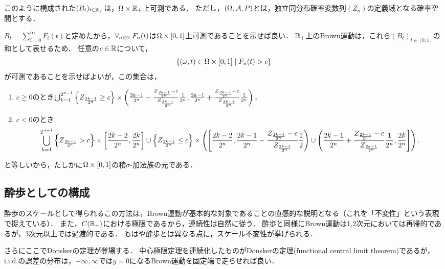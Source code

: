 \documentclass[uplatex,dvipdfmx]{jsreport}
\begin{document}
\begin{proposition}
    このように構成された$(B_t)_{t\in\mathbb{R}_+}$は，$\Omega\times\mathbb{R}_+$上可測である．
    ただし，$(\Omega,\mathcal{A},P)$とは，独立同分布確率変数列$(Z_n)$の定義域となる確率空間とする．
\end{proposition}
\begin{Proof}
    $B_t=\sum^\infty_{i=0}F_i(t)$と定めたから，$\forall_{n\in\mathbb{N}}\;F_n(t)$は$\Omega\times[0,1]$上可測であることを示せば良い．
    $\mathbb{R}_+$上のBrown運動は，これら$(B_t)_{t\in[0,1]}$の和として表せるため．
    任意の$c\in\mathbb{R}$について，
    \[\left\{(\omega,t)\in\Omega\times[0,1]\mid F_n(t)>c\right\}\]
    が可測であることを示せばよいが，この集合は，
    \begin{enumerate}
        \item $c\ge0$のとき$\bigcup_{k=1}^{2^{n-1}}\left\{Z_{\frac{2k-1}{2^n}}\ge c\right\}\times\left(\frac{2k-1}{2^n}-\frac{Z_{\frac{2k-1}{2^n}}-c}{Z_{\frac{2k-1}{2^n}}}\frac{1}{2^n},\frac{2k-1}{2^n}+\frac{Z_{\frac{2k-1}{2^n}}-c}{Z_{\frac{2k-1}{2^n}}}\frac{1}{2^n}\right)$．
        \item $c<0$のとき\[\bigcup_{k=1}^{2^{n-1}}\left\{Z_{\frac{2k-1}{2^n}}>c\right\}\times\left[\frac{2k-2}{2^n},\frac{2k}{2^n}\right]\cup\left\{Z_{\frac{2k-1}{2^n}}\le c\right\}\times\left(\left[\frac{2k-2}{2^n},\frac{2k-1}{2^n}-\frac{Z_{\frac{2k-1}{2^n}}-c}{Z_{\frac{2k-1}{2^n}}}\frac{1}{2}\right)\cup\left(\frac{2k-1}{2^n}+\frac{Z_{\frac{2k-1}{2^n}}-c}{Z_{\frac{2k-1}{2^n}}}\frac{1}{2^n},\frac{2k}{2^n}\right]\right).\]
    \end{enumerate}
    と等しいから，たしかに$\Omega\times[0,1]$の積$\sigma$-加法族の元である．
\end{Proof}

\subsection{酔歩としての構成}

\begin{tcolorbox}[colframe=ForestGreen, colback=ForestGreen!10!white,breakable,colbacktitle=ForestGreen!40!white,coltitle=black,fonttitle=\bfseries\sffamily,
title=]
    酔歩のスケールとして得られるこの方法は，Brown運動が基本的な対象であることの直感的な説明となる（これを「不変性」という表現で捉えている）．
    また，$C(\mathbb{R}_+)$における極限であるから，連続性は自然に従う．
    酔歩と同様にBrown運動は1,2次元においては再帰的であるが，3次元以上では過渡的である．
    もはや酔歩とは異なる点に，スケール不変性が挙げられる．

    さらにここでDonskerの定理が登場する．
    中心極限定理を連続化したものがDonskerの定理(functional central limit theorem)であるが，i.i.d.の誤差の分布は，$-\infty,\infty$では$y=0$になるBrown運動を固定端で走らせれば良い．
\end{tcolorbox}
\end{document}
